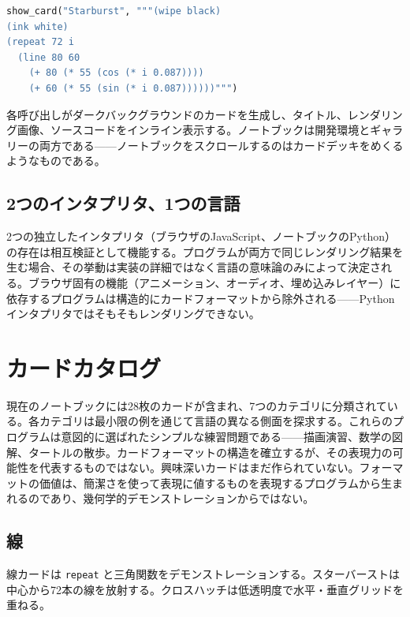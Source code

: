 \documentclass[10pt,letterpaper,twocolumn]{article}
\begin{document}
\begin{lstlisting}[language=python,basicstyle=\ttfamily\footnotesize]
show_card("Starburst", """(wipe black)
(ink white)
(repeat 72 i
  (line 80 60
    (+ 80 (* 55 (cos (* i 0.087))))
    (+ 60 (* 55 (sin (* i 0.087))))))""")
\end{lstlisting}

各呼び出しがダークバックグラウンドのカードを生成し、タイトル、レンダリング画像、ソースコードをインライン表示する。ノートブックは開発環境とギャラリーの両方である——ノートブックをスクロールするのはカードデッキをめくるようなものである。

\subsection{2つのインタプリタ、1つの言語}

2つの独立したインタプリタ（ブラウザのJavaScript、ノートブックのPython）の存在は相互検証として機能する。プログラムが両方で同じレンダリング結果を生む場合、その挙動は実装の詳細ではなく言語の意味論のみによって決定される。ブラウザ固有の機能（アニメーション、オーディオ、埋め込みレイヤー）に依存するプログラムは構造的にカードフォーマットから除外される——Pythonインタプリタではそもそもレンダリングできない。


\section{カードカタログ}
\label{sec:catalog}

現在のノートブックには28枚のカードが含まれ、7つのカテゴリに分類されている。各カテゴリは最小限の例を通じて言語の異なる側面を探求する。これらのプログラムは意図的に選ばれたシンプルな練習問題である——描画演習、数学の図解、タートルの散歩。カードフォーマットの構造を確立するが、その表現力の可能性を代表するものではない。興味深いカードはまだ作られていない。フォーマットの価値は、簡潔さを使って表現に値するものを表現するプログラムから生まれるのであり、幾何学的デモンストレーションからではない。

\subsection{線}

線カードは \texttt{repeat} と三角関数をデモンストレーションする。スターバーストは中心から72本の線を放射する。クロスハッチは低透明度で水平・垂直グリッドを重ねる。
\end{document}
